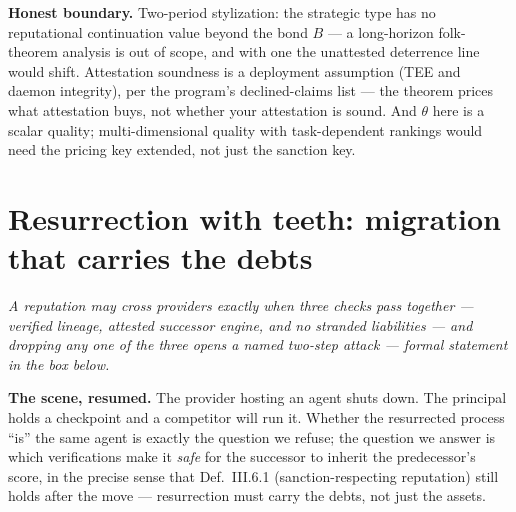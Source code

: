 \documentclass[11pt,a4paper]{article}
\newcommand{\onebreath}[1]{\begin{center}\emph{#1}\end{center}}
\begin{document}
\begin{boundary}
\textbf{Honest boundary.} Two-period stylization: the strategic type has no reputational continuation value beyond the bond $B$
--- a long-horizon folk-theorem analysis is out of scope, and with one the unattested deterrence line would shift. Attestation
soundness is a deployment assumption (TEE and daemon integrity), per the program's declined-claims list --- the theorem prices what
attestation buys, not whether your attestation is sound. And $\theta$ here is a scalar quality; multi-dimensional quality with
task-dependent rankings would need the pricing key extended, not just the sanction key.
\end{boundary}

\section{Resurrection with teeth: migration that carries the debts}\label{sec:resurrection}

\onebreath{A reputation may cross providers exactly when three checks pass together --- verified lineage, attested successor
engine, and no stranded liabilities --- and dropping any one of the three opens a named two-step attack --- formal statement in the
box below.}

\textbf{The scene, resumed.} The provider hosting an agent shuts down. The principal holds a checkpoint and a competitor will run
it. Whether the resurrected process ``is'' the same agent is exactly the question we refuse; the question we answer is which
verifications make it \emph{safe} for the successor to inherit the predecessor's score, in the precise sense that Def.~III.6.1
(sanction-respecting reputation) still holds after the move --- resurrection must carry the debts, not just the assets.
\end{document}
